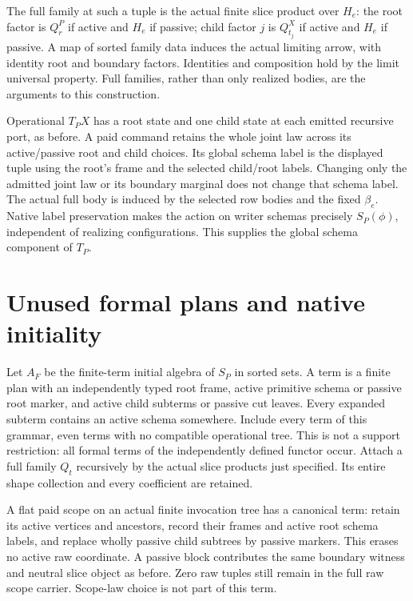 \documentclass[11pt]{article}
\begin{document}
The full family at such a tuple is the actual finite slice product over $H_e$: the root factor is $Q^P_r$ if active and $H_e$ if passive; child factor $j$ is $Q^X_{t_j}$ if active and $H_e$ if passive. A map of sorted family data induces the actual limiting arrow, with identity root and boundary factors. Identities and composition hold by the limit universal property. Full families, rather than only realized bodies, are the arguments to this construction.

Operational $T_PX$ has a root state and one child state at each emitted recursive port, as before. A paid command retains the whole joint law across its active/passive root and child choices. Its global schema label is the displayed tuple using the root's frame and the selected child/root labels. Changing only the admitted joint law or its boundary marginal does not change that schema label. The actual full body is induced by the selected row bodies and the fixed $\beta_e$. Native label preservation makes the action on writer schemas precisely $S_P(\phi)$, independent of realizing configurations. This supplies the global schema component of $T_P$.

\section{Unused formal plans and native initiality}
Let $A_F$ be the finite-term initial algebra of $S_P$ in sorted sets. A term is a finite plan with an independently typed root frame, active primitive schema or passive root marker, and active child subterms or passive cut leaves. Every expanded subterm contains an active schema somewhere. Include every term of this grammar, even terms with no compatible operational tree. This is not a support restriction: all formal terms of the independently defined functor occur. Attach a full family $Q_t$ recursively by the actual slice products just specified. Its entire shape collection and every coefficient are retained.

A flat paid scope on an actual finite invocation tree has a canonical term: retain its active vertices and ancestors, record their frames and active root schema labels, and replace wholly passive child subtrees by passive markers. This erases no active raw coordinate. A passive block contributes the same boundary witness and neutral slice object as before. Zero raw tuples still remain in the full raw scope carrier. Scope-law choice is not part of this term.
\end{document}
